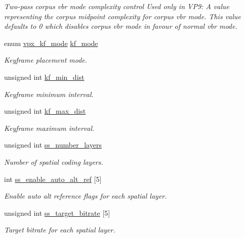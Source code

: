 \begin{DoxyCompactItemize}
\begin{DoxyCompactList}\small\item\em Two-\/pass corpus vbr mode complexity control Used only in V\+P9\+: A value representing the corpus midpoint complexity for corpus vbr mode. This value defaults to 0 which disables corpus vbr mode in favour of normal vbr mode. \end{DoxyCompactList}\item 
enum \hyperlink{group__encoder_ga9f461802aa4db35c04a8b23837987f40}{vpx\+\_\+kf\+\_\+mode} \hyperlink{structvpx__codec__enc__cfg_a491d67f061dcdb13f60c017563e9d788}{kf\+\_\+mode}
\begin{DoxyCompactList}\small\item\em Keyframe placement mode. \end{DoxyCompactList}\item 
unsigned int \hyperlink{structvpx__codec__enc__cfg_a0a7b5444ecb09745cbe8d5af17553846}{kf\+\_\+min\+\_\+dist}
\begin{DoxyCompactList}\small\item\em Keyframe minimum interval. \end{DoxyCompactList}\item 
unsigned int \hyperlink{structvpx__codec__enc__cfg_ae018440136e271743376730413d25a9b}{kf\+\_\+max\+\_\+dist}
\begin{DoxyCompactList}\small\item\em Keyframe maximum interval. \end{DoxyCompactList}\item 
unsigned int \hyperlink{structvpx__codec__enc__cfg_a1e5e1d00b22f2ba8c5c7230f31900f95}{ss\+\_\+number\+\_\+layers}
\begin{DoxyCompactList}\small\item\em Number of spatial coding layers. \end{DoxyCompactList}\item 
int \hyperlink{structvpx__codec__enc__cfg_a26e33bbfa43485c21ea58da6cee23c36}{ss\+\_\+enable\+\_\+auto\+\_\+alt\+\_\+ref} \mbox{[}5\mbox{]}
\begin{DoxyCompactList}\small\item\em Enable auto alt reference flags for each spatial layer. \end{DoxyCompactList}\item 
unsigned int \hyperlink{structvpx__codec__enc__cfg_a5ff2f5884109736d0c2464bc156fda1f}{ss\+\_\+target\+\_\+bitrate} \mbox{[}5\mbox{]}
\begin{DoxyCompactList}\small\item\em Target bitrate for each spatial layer. \end{DoxyCompactList}\item 

\end{DoxyCompactItemize}
